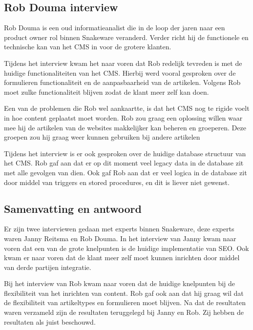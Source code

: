 \subsection{Rob Douma interview}
\label{sec:RobInterview}
Rob Douma is een oud informatieanalist die in de loop der jaren naar een product owner rol binnen Snakeware veranderd.
Verder richt hij de functionele en technische kan van het CMS in voor de grotere klanten.

\whitespace
Tijdens het interview kwam het naar voren dat Rob redelijk tevreden is met de huidige functionaliteiten van het CMS. 
Hierbij werd vooral gesproken over de formulieren functionaliteit en de aanpasbaarheid van de artikelen.
Volgens Rob moet zulke functionaliteit blijven zodat de klant meer zelf kan doen.

\whitespace
Een van de problemen die Rob wel aankaartte, is dat het CMS nog te rigide voelt in hoe content geplaatst moet worden.
Rob zou graag een oplossing willen waar mee hij  de artikelen van de websites makkelijker kan beheren en groeperen.
Deze groepen zou hij graag weer kunnen gebruiken bij andere artikelen

%
\newpage
\whitespace
Tijdens het interview is er ook gesproken over de huidige database structuur van het CMS.
Rob gaf aan dat er op dit moment veel legacy data in de database zit met alle gevolgen van dien.
Ook gaf Rob aan dat er veel logica in de database zit door middel van triggers en stored procedures, en dit is liever niet gewenst.

\subsection{Samenvatting en antwoord}
Er zijn twee interviewen gedaan met experts binnen Snakeware, deze experts waren Janny Reitsma en Rob Douma.
In het interview van Janny kwam naar voren dat een van de grote knelpunten is de huidige implementatie van \gls{SEO}.
Ook kwam er naar voren dat de klant meer zelf moet kunnen inrichten door middel van derde partijen integratie.

\whitespace
Bij het interview van Rob kwam naar voren dat de huidige knelpunten bij de flexibiliteit van het inrichten van content.
Rob gaf ook aan dat hij graag wil dat de flexibiliteit van artikeltypes en formulieren moet blijven.
Na dat de resultaten waren verzameld zijn de resultaten teruggelegd bij Janny en Rob.
Zij hebben de resultaten als juist beschouwd.
